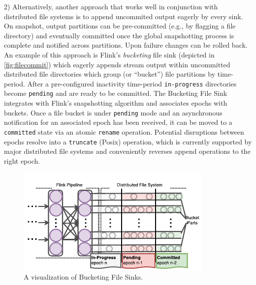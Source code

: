 2) Alternatively, another approach that works well in conjunction with distributed file systems is to append uncommited output eagerly by every sink. On snapshot, output partitions can be pre-committed (e.g., by flagging a file directory) and eventually committed once the global snapshotting process is complete and notified across partitions. Upon failure changes can be rolled back. An example of this approach is Flink's \emph{bucketing} file sink (depicted in \autoref{fig:filecommit}) which eagerly appends stream output within uncommitted distributed file directories which group (or ``bucket'') file partitions by time-period. After a pre-configured inactivity time-period \texttt{in-progress} directories become \texttt{pending} and are ready to be committed. The Bucketing File Sink integrates with Flink's snapshotting algorithm and associates epochs with buckets. Once a file bucket is under \texttt{pending} mode and an asynchronous notification for an associated epoch has been received, it can be moved to a \texttt{committed} state via an atomic \texttt{rename} operation. Potential disruptions between epochs resolve into a \texttt{truncate} (Posix) operation, which is currently supported by major distributed file systems and conveniently reverses append operations to the right epoch.


\begin{figure}[t!]
\centering
\includegraphics[width=\textwidth / 2]{figures/filecommit.pdf}
\caption{A visualization of Bucketing File Sinks.} 
\label{fig:filecommit}
\vspace{-2mm}
\end{figure}



